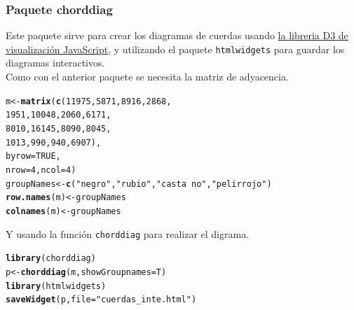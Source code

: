 \documentclass{article}\usepackage[]{graphicx}\usepackage[]{color}
\makeatletter
\newcommand{\hlnum}[1]{\textcolor[rgb]{0.686,0.059,0.569}{#1}}%
\newcommand{\hlstr}[1]{\textcolor[rgb]{0.192,0.494,0.8}{#1}}%
\newcommand{\hlstd}[1]{\textcolor[rgb]{0.345,0.345,0.345}{#1}}%
\newcommand{\hlkwb}[1]{\textcolor[rgb]{0.69,0.353,0.396}{#1}}%
\newcommand{\hlkwc}[1]{\textcolor[rgb]{0.333,0.667,0.333}{#1}}%
\newcommand{\hlkwd}[1]{\textcolor[rgb]{0.737,0.353,0.396}{\textbf{#1}}}%
\newenvironment{kframe}{%
 \def\at@end@of@kframe{}%
 \ifinner\ifhmode%
  \def\at@end@of@kframe{\end{minipage}}%
  \begin{minipage}{\columnwidth}%
 \fi\fi%
 \def\FrameCommand##1{\hskip\@totalleftmargin \hskip-\fboxsep
 \colorbox{shadecolor}{##1}\hskip-\fboxsep
     \hskip-\linewidth \hskip-\@totalleftmargin \hskip\columnwidth}%
 \MakeFramed {\advance\hsize-\width
   \@totalleftmargin\z@ \linewidth\hsize
   \@setminipage}}%
 {\par\unskip\endMakeFramed%
 \at@end@of@kframe}
\newenvironment{knitrout}{}{} %
\makeatother
\begin{document}
\subsubsection{Paquete chorddiag}
Este paquete \cite{docu_chorddiag}
sirve para crear los diagramas de cuerdas usando \href{https://d3js.org/}{la libreria D3 de visualizaci\'on JavaScript}, y utilizando el paquete \texttt{htmlwidgets} para guardar los diagramas interactivos.~\\
Como con el anterior paquete se necesita la matriz de adyacencia.
\begin{knitrout}
\color{fgcolor}\begin{kframe}
\begin{alltt}
\hlstd{m} \hlkwb{<-} \hlkwd{matrix}\hlstd{(}\hlkwd{c}\hlstd{(}\hlnum{11975}\hlstd{,}  \hlnum{5871}\hlstd{,} \hlnum{8916}\hlstd{,} \hlnum{2868}\hlstd{,}
              \hlnum{1951}\hlstd{,} \hlnum{10048}\hlstd{,} \hlnum{2060}\hlstd{,} \hlnum{6171}\hlstd{,}
              \hlnum{8010}\hlstd{,} \hlnum{16145}\hlstd{,} \hlnum{8090}\hlstd{,} \hlnum{8045}\hlstd{,}
              \hlnum{1013}\hlstd{,}   \hlnum{990}\hlstd{,}  \hlnum{940}\hlstd{,} \hlnum{6907}\hlstd{),}
            \hlkwc{byrow} \hlstd{=} \hlnum{TRUE}\hlstd{,}
            \hlkwc{nrow} \hlstd{=} \hlnum{4}\hlstd{,} \hlkwc{ncol} \hlstd{=} \hlnum{4}\hlstd{)}
\hlstd{groupNames} \hlkwb{<-} \hlkwd{c}\hlstd{(}\hlstr{"negro"}\hlstd{,} \hlstr{"rubio"}\hlstd{,} \hlstr{"casta~no"}\hlstd{,} \hlstr{"pelirrojo"}\hlstd{)}
\hlkwd{row.names}\hlstd{(m)} \hlkwb{<-} \hlstd{groupNames}
\hlkwd{colnames}\hlstd{(m)} \hlkwb{<-} \hlstd{groupNames}
\end{alltt}
\end{kframe}
\end{knitrout}
Y usando la funci\'on \texttt{chorddiag} para realizar el digrama.
\begin{knitrout}
\color{fgcolor}\begin{kframe}
\begin{alltt}
\hlkwd{library}\hlstd{(chorddiag)}
\hlstd{p} \hlkwb{<-} \hlkwd{chorddiag}\hlstd{(m,} \hlkwc{showGroupnames} \hlstd{= T)}
\hlkwd{library}\hlstd{(htmlwidgets)}
\hlkwd{saveWidget}\hlstd{(p,} \hlkwc{file} \hlstd{=} \hlstr{"cuerdas_inte.html"}\hlstd{)}
\end{alltt}
\end{kframe}
\end{knitrout}
\end{document}
